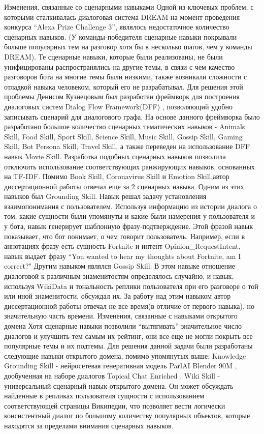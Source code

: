 Изменения, связанные со сценарными навыками
Одной из ключевых проблем, с которыми сталкивалась диалоговая система DREAM на момент проведения конкурса “Alexa Prize Challenge 3”, являлось недостаточное количество сценарных навыков. (У команды-победителя сценарные навыки покрывали больше популярных тем на разговор хотя бы в несколько шагов, чем у команды DREAM). Те сценарные навыки, которые были реализованы, не были унифицированы распространялись на другие темы, в связи с чем качество разговоров бота на многие темы были низкими, также возникали сложности с отладкой навыка человеком, который его не разрабатывал. Для решения этой проблемы Денисом Кузнецовым был разработан фреймворк для построения диалоговых систем Dialog Flow Framework(DFF) \cite{Dialog Flow Framework}  , позволяющий удобно записывать сценарий для диалогового графа. На основе данного фреймворка было разработано большое количество сценарных тематических навыков - Animals Skill, Food Skill, Sport Skill, Science Skill, Music Skill, Gossip Skill, Gaming Skill, Bot Persona Skill, Travel Skill, а также переведен на использование DFF навык Movie Skill. Разработка подобных сценарных навыков позволила отключить использование соответствующих ранжирующих навыков, основанных на TF-IDF.
Помимо Book Skill, Coronavirus Skill и Emotion Skill,автор диссертационной работы отвечал еще за 2 сценарных навыка.
Одним из этих навыков был Grounding Skill. Навык решал задачу установления взаимопонимания с пользователем. Используя информацию из истории диалога о том, какие сущности были упомянуты и какие были намерения у пользователя и у бота, навык генерирует шаблонную фразу-подтверждение. Этой фразой навык показывает, что бот понимает, о чем говорит пользователь. Например, если в аннотациях фразу есть сущность Fortnite и интент Opinion_RequestIntent, навык выдает фразу “You wanted to hear my thoughts about Fortnite, am I correct?"
Другим навыком являлся Gossip Skill. В этом навыке отношение диалоговой к различным знаменитостям определялось случайно, и навык, используя WikiData и тональность реплики пользователя при его разговоре о той или иной знаменитости, обсуждал их. За работу над этим навыком автор диссертационной работы отвечал не все время(в отличие от первого навыка), но значительную часть времени.
Изменения, связанные с навыками открытого домена
Хотя сценарные навыки позволили “вытягивать” значительное число диалогов и улучшить тем самым их рейтинг, они все еще не могли покрыть все популярные темы и их подтемы. Для решения данной задачи были разработаны следующие навыки открытого домена, помимо упомянутых выше:
Knowledge Grounding Skill - нейросетевая генеративная модель ParlAI Blender 90M \cite{Roller_Dinan_Goyal_Da Ju_Williamson_Liu_Xu_Ott_Shuster_Smith_et al._2020}, дообученная на наборе диалогов Topical Chat Enriched \cite{Hedayatnia_Kim_Liu_Gopalakrishnan_Eric_Hakkani-Tur_2020}.
Wiki Skill - универсальный сценарный навык открытого домена. Он может обсуждать найденные в репликах пользователя сущности с использованием соответствующей страницы Википедии, что позволяет вести логически консистентный диалог по большому количеству популярных объектов, которые находятся за пределами внимания сценарных навыков.

